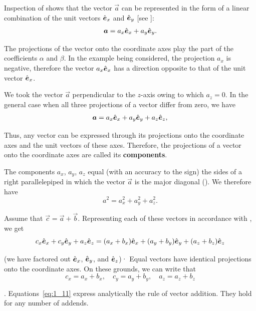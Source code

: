 Inspection of  shows that the vector $\vec{a}$ can be represented in the form of a linear combination of the unit vectors $\hat{\boldsymbol{e}}_{x}$ and $\hat{\boldsymbol{e}}_{y}$ [see ]:
\begin{equation*}
\boldsymbol{a} = a_x \hat{\boldsymbol{e}}_{x} + a_y \hat{\boldsymbol{e}}_{y}.
\end{equation*}

\noindent
The projections of the vector onto the coordinate axes play the part of the coefficients $\alpha$ and $\beta$. In the example being considered, the projection $a_x$ is negative, therefore the vector $a_x\hat{\boldsymbol{e}}_{x}$ has a direction opposite to that of the unit vector $\hat{\boldsymbol{e}}_{x}$.

We took the vector $\vec{a}$ perpendicular to the $z$-axis owing to which $a_z=0$. In the general case when all three projections of a vector differ from zero, we have
\begin{equation}\label{eq:1_9}
\boldsymbol{a} = a_x \hat{\boldsymbol{e}}_{x} + a_y \hat{\boldsymbol{e}}_{y} + a_z \hat{\boldsymbol{e}}_{z},
\end{equation}

\noindent
Thus, any vector can be expressed through its projections onto the coordinate axes and the unit vectors of these axes. Therefore, the projections of a vector onto the coordinate axes are called its \textbf{components}.

The components $a_x$, $a_y$, $a_z$ equal (with an accuracy to the sign) the sides of a right parallelepiped in which the vector $\vec{a}$ is the major diagonal (). We therefore have
\begin{equation}\label{eq:1_10}
a^2 = a_x^2 + a_y^2 + a_z^2.
\end{equation}

Assume that $\vec{c}=\vec{a}+\vec{b}$. Representing each of these vectors in accordance with , we get
\begin{equation*}
c_x\hat{\boldsymbol{e}}_{x} + c_y\hat{\boldsymbol{e}}_{y} + a_z\hat{\boldsymbol{e}}_{z} = (a_x+b_x)\hat{\boldsymbol{e}}_{x} + (a_y+b_y)\hat{\boldsymbol{e}}_{y} + (a_z+b_z)\hat{\boldsymbol{e}}_{z}
\end{equation*}

\noindent
(we have factored out $\hat{\boldsymbol{e}}_{x}$, $\hat{\boldsymbol{e}}_{y}$, and $\hat{\boldsymbol{e}}_{z}$)· Equal vectors have identical projections onto the coordinate axes. On these grounds, we can write that
\begin{equation}\label{eq:1_11}
c_x=a_x+b_x,\quad c_y=a_y+b_y,\quad a_z=a_z+b_z
\end{equation}

. Equations~\eqref{eq:1_11} express analytically the rule of vector addition. They hold for any number of addends.

